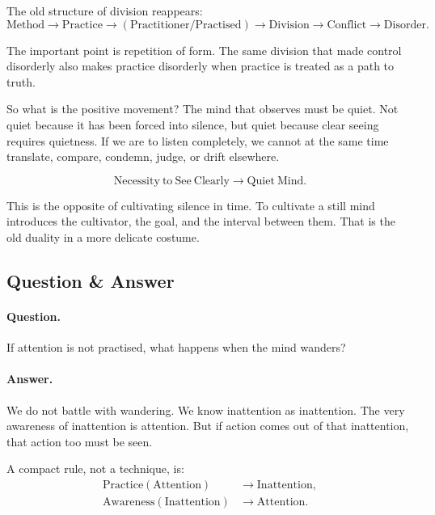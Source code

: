 The old structure of division reappears:
\begin{equation}
\mathrm{Method}
\longrightarrow
\mathrm{Practice}
\longrightarrow
(\mathrm{Practitioner}/\mathrm{Practised})
\longrightarrow
\mathrm{Division}
\longrightarrow
\mathrm{Conflict}
\longrightarrow
\mathrm{Disorder}.
\end{equation}

The important point is repetition of form. The same division that made control disorderly also makes practice disorderly when practice is treated as a path to truth.

So what is the positive movement? The mind that observes must be quiet. Not quiet because it has been forced into silence, but quiet because clear seeing requires quietness. If we are to listen completely, we cannot at the same time translate, compare, condemn, judge, or drift elsewhere.

\begin{equation}
\mathrm{Necessity\ to\ See\ Clearly}
\longrightarrow
\mathrm{Quiet\ Mind}.
\end{equation}

This is the opposite of cultivating silence in time. To cultivate a still mind introduces the cultivator, the goal, and the interval between them. That is the old duality in a more delicate costume.

\subsection{Question \& Answer}

\paragraph{Question.}
If attention is not practised, what happens when the mind wanders?

\paragraph{Answer.}
We do not battle with wandering. We know inattention as inattention. The very awareness of inattention is attention. But if action comes out of that inattention, that action too must be seen.

A compact rule, not a technique, is:
\begin{align}
\mathrm{Practice}(\mathrm{Attention}) &\longrightarrow \mathrm{Inattention},\\
\mathrm{Awareness}(\mathrm{Inattention}) &\longrightarrow \mathrm{Attention}.
\end{align}

